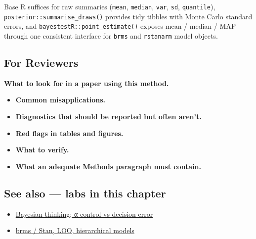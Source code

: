 \documentclass[
]{article}
\providecommand{\tightlist}{%
  \setlength{\itemsep}{0pt}\setlength{\parskip}{0pt}}
\begin{document}
Base R suffices for raw summaries (\texttt{mean}, \texttt{median},
\texttt{var}, \texttt{sd}, \texttt{quantile}),
\texttt{posterior::summarise\_draws()} provides tidy tibbles with Monte
Carlo standard errors, and \texttt{bayestestR::point\_estimate()}
exposes mean / median / MAP through one consistent interface for
\texttt{brms} and \texttt{rstanarm} model objects.

\subsection{For Reviewers}\label{for-reviewers}

\textbf{What to look for in a paper using this method.}

\begin{itemize}
\tightlist
\item
  \textbf{Common misapplications.}
\item
  \textbf{Diagnostics that should be reported but often aren't.}
\item
  \textbf{Red flags in tables and figures.}
\item
  \textbf{What to verify.}
\item
  \textbf{What an adequate Methods paragraph must contain.}
\end{itemize}

\subsection{See also --- labs in this
chapter}\label{see-also-labs-in-this-chapter}

\begin{itemize}
\tightlist
\item
  \href{labs/lab-bayesian-thinking-control-vs-decision-error.Rmd}{Bayesian
  thinking; α control vs decision error}
\item
  \href{labs/lab-brms-stan-loo-hierarchical-models.Rmd}{brms / Stan,
  LOO, hierarchical models}
\end{itemize}
\end{document}
